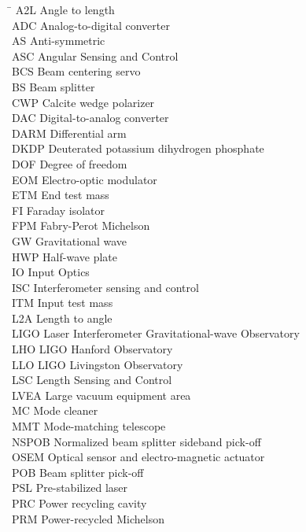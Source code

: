 \begin{tabbing}
\hspace{1in} \= \kill
A2L \> Angle to length \\
ADC \> Analog-to-digital converter \\
AS \> Anti-symmetric \\
ASC \> Angular Sensing and Control \\
BCS \> Beam centering servo \\
BS \> Beam splitter \\
CWP \> Calcite wedge polarizer \\
DAC \> Digital-to-analog converter\\
DARM \> Differential arm \\
DKDP \> Deuterated potassium dihydrogen phosphate \\
DOF \> Degree of freedom \\
EOM \> Electro-optic modulator \\
ETM \> End test mass \\
FI \> Faraday isolator \\
FPM \> Fabry-Perot Michelson \\
GW \> Gravitational wave \\
HWP \> Half-wave plate \\
IO \> Input Optics \\
ISC \> Interferometer sensing and control \\
ITM \> Input test mass \\
L2A \> Length to angle \\
LIGO \> Laser Interferometer Gravitational-wave Observatory \\
LHO \> LIGO Hanford Observatory \\
LLO \> LIGO Livingston Observatory \\
LSC \> Length Sensing and Control \\
LVEA \> Large vacuum equipment area \\
MC \> Mode cleaner \\
MMT \> Mode-matching telescope \\
NSPOB \> Normalized beam splitter sideband pick-off \\
OSEM \> Optical sensor and electro-magnetic actuator \\
POB \> Beam splitter pick-off \\
PSL \> Pre-stabilized laser \\
PRC \> Power recycling cavity \\
PRM \> Power-recycled Michelson \\

\end{tabbing}
